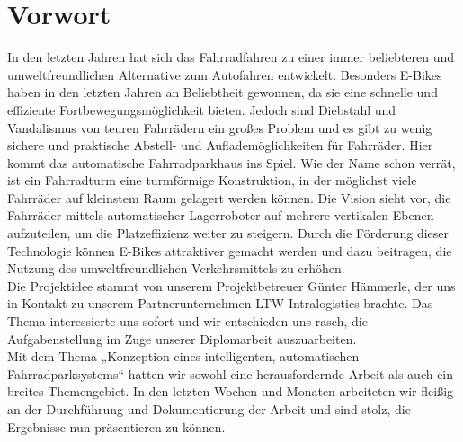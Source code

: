 \section*{Vorwort}
In den letzten Jahren hat sich das Fahrradfahren zu einer immer beliebteren und umweltfreundlichen Alternative zum Autofahren entwickelt. Besonders E-Bikes haben in den letzten Jahren an Beliebtheit gewonnen, da sie eine schnelle und effiziente Fortbewegungsmöglichkeit bieten. Jedoch sind Diebstahl und Vandalismus von teuren Fahrrädern ein großes Problem und es gibt zu wenig sichere und praktische Abstell- und Auflademöglichkeiten für Fahrräder. Hier kommt das automatische Fahrradparkhaus ins Spiel. Wie der Name schon verrät, ist ein Fahrradturm eine turmförmige Konstruktion, in der möglichst viele Fahrräder auf kleinstem Raum gelagert werden können. Die Vision sieht vor, die Fahrräder mittels automatischer Lagerroboter auf mehrere vertikalen Ebenen aufzuteilen, um die Platzeffizienz weiter zu steigern. Durch die Förderung dieser Technologie können E-Bikes attraktiver gemacht werden und dazu beitragen, die Nutzung des umweltfreundlichen Verkehrsmittels zu erhöhen.\\
Die Projektidee stammt von unserem Projektbetreuer Günter Hämmerle, der uns in Kontakt zu unserem Partnerunternehmen LTW Intralogistics brachte. Das Thema interessierte uns sofort und wir entschieden uns rasch, die Aufgabenstellung im Zuge unserer Diplomarbeit auszuarbeiten.\\
Mit dem Thema „Konzeption eines intelligenten, automatischen Fahrradparksystems“ hatten wir sowohl eine herausfordernde Arbeit als auch ein breites Themengebiet. In den letzten Wochen und Monaten arbeiteten wir fleißig an der Durchführung und Dokumentierung der Arbeit und sind stolz, die Ergebnisse nun präsentieren zu können.\\

